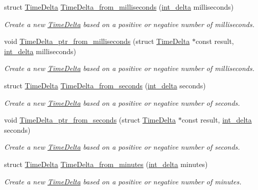 \begin{DoxyCompactItemize}
struct \hyperlink{structTimeDelta}{Time\-Delta} \hyperlink{time-delta_8h_ae7919eccd5d372f5f954d560792699b5}{Time\-Delta\-\_\-from\-\_\-milliseconds} (\hyperlink{types_8h_a8a67cf99971c5cfeeaa2380ba84a4c92}{int\-\_\-delta} milliseconds)
\begin{DoxyCompactList}\small\item\em Create a new \hyperlink{structTimeDelta}{Time\-Delta} based on a positive or negative number of milliseconds. \end{DoxyCompactList}\item 
void \hyperlink{time-delta_8h_acb7d8deb451a9bb66beed73aba9d0e38}{Time\-Delta\-\_\-ptr\-\_\-from\-\_\-milliseconds} (struct \hyperlink{structTimeDelta}{Time\-Delta} $\ast$const result, \hyperlink{types_8h_a8a67cf99971c5cfeeaa2380ba84a4c92}{int\-\_\-delta} milliseconds)
\begin{DoxyCompactList}\small\item\em Create a new \hyperlink{structTimeDelta}{Time\-Delta} based on a positive or negative number of milliseconds. \end{DoxyCompactList}\item 
struct \hyperlink{structTimeDelta}{Time\-Delta} \hyperlink{time-delta_8h_ae0ba972261d5dd8b375af9b207311baf}{Time\-Delta\-\_\-from\-\_\-seconds} (\hyperlink{types_8h_a8a67cf99971c5cfeeaa2380ba84a4c92}{int\-\_\-delta} seconds)
\begin{DoxyCompactList}\small\item\em Create a new \hyperlink{structTimeDelta}{Time\-Delta} based on a positive or negative number of seconds. \end{DoxyCompactList}\item 
void \hyperlink{time-delta_8h_a1e3688e1b3dffd7a51115323ff4da8e2}{Time\-Delta\-\_\-ptr\-\_\-from\-\_\-seconds} (struct \hyperlink{structTimeDelta}{Time\-Delta} $\ast$const result, \hyperlink{types_8h_a8a67cf99971c5cfeeaa2380ba84a4c92}{int\-\_\-delta} seconds)
\begin{DoxyCompactList}\small\item\em Create a new \hyperlink{structTimeDelta}{Time\-Delta} based on a positive or negative number of seconds. \end{DoxyCompactList}\item 
struct \hyperlink{structTimeDelta}{Time\-Delta} \hyperlink{time-delta_8h_a18b5bed19a394a36890c2578fe05e5b1}{Time\-Delta\-\_\-from\-\_\-minutes} (\hyperlink{types_8h_a8a67cf99971c5cfeeaa2380ba84a4c92}{int\-\_\-delta} minutes)
\begin{DoxyCompactList}\small\item\em Create a new \hyperlink{structTimeDelta}{Time\-Delta} based on a positive or negative number of minutes. \end{DoxyCompactList}\item 

\end{DoxyCompactItemize}
